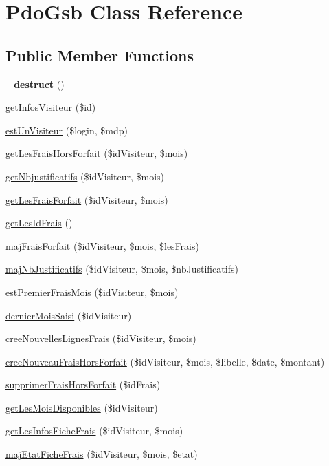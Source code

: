 \hypertarget{class_pdo_gsb}{}\section{Pdo\+Gsb Class Reference}
\label{class_pdo_gsb}
\subsection*{Public Member Functions}
\begin{DoxyCompactItemize}
\item 
\hypertarget{class_pdo_gsb_a1c6024f681d3956654622d9f28e540a2}{}{\bfseries \+\_\+destruct} ()\label{class_pdo_gsb_a1c6024f681d3956654622d9f28e540a2}

\item 
\hyperlink{class_pdo_gsb_a3f8a27838c97cb782a1c57b8e8650ebb}{get\+Infos\+Visiteur} (\$id)
\item 
\hyperlink{class_pdo_gsb_a53a04231e10e756bc80f4f04233c9e84}{est\+Un\+Visiteur} (\$login, \$mdp)
\item 
\hyperlink{class_pdo_gsb_aa89782786e0037745abd9c62b25ade20}{get\+Les\+Frais\+Hors\+Forfait} (\$id\+Visiteur, \$mois)
\item 
\hyperlink{class_pdo_gsb_a147b85ddcddef68c57acf34857630ba7}{get\+Nbjustificatifs} (\$id\+Visiteur, \$mois)
\item 
\hyperlink{class_pdo_gsb_a5792eb474723cda0a758735f5fbb791e}{get\+Les\+Frais\+Forfait} (\$id\+Visiteur, \$mois)
\item 
\hyperlink{class_pdo_gsb_ad0943d4cabc4e6bfd803ecab13be0e57}{get\+Les\+Id\+Frais} ()
\item 
\hyperlink{class_pdo_gsb_abeb6aae3e806cd3235ebec6ae5cbe7de}{maj\+Frais\+Forfait} (\$id\+Visiteur, \$mois, \$les\+Frais)
\item 
\hyperlink{class_pdo_gsb_ac3bcdeeb2e7522120cec7ec068b153b3}{maj\+Nb\+Justificatifs} (\$id\+Visiteur, \$mois, \$nb\+Justificatifs)
\item 
\hyperlink{class_pdo_gsb_a426147406c706370eeb5d17175c33562}{est\+Premier\+Frais\+Mois} (\$id\+Visiteur, \$mois)
\item 
\hyperlink{class_pdo_gsb_a5bde16f5acfa92c7810433187f3e05f1}{dernier\+Mois\+Saisi} (\$id\+Visiteur)
\item 
\hyperlink{class_pdo_gsb_ae42a666f0c62b60a6fe35448e3600d8a}{cree\+Nouvelles\+Lignes\+Frais} (\$id\+Visiteur, \$mois)
\item 
\hyperlink{class_pdo_gsb_a5b4ae76bd318baa9ee6d57f53b43d1d8}{cree\+Nouveau\+Frais\+Hors\+Forfait} (\$id\+Visiteur, \$mois, \$libelle, \$date, \$montant)
\item 
\hyperlink{class_pdo_gsb_a8806fa2b12726a88a04845316e7c9586}{supprimer\+Frais\+Hors\+Forfait} (\$id\+Frais)
\item 
\hyperlink{class_pdo_gsb_a34f4b6a3081514827f3726ac49dcded3}{get\+Les\+Mois\+Disponibles} (\$id\+Visiteur)
\item 
\hyperlink{class_pdo_gsb_af243a6fda5669151cd4d35c66bcd13a4}{get\+Les\+Infos\+Fiche\+Frais} (\$id\+Visiteur, \$mois)
\item 
\hyperlink{class_pdo_gsb_a92f294d975e98efcfa1d4c9e08a51bcc}{maj\+Etat\+Fiche\+Frais} (\$id\+Visiteur, \$mois, \$etat)
\end{DoxyCompactItemize}
